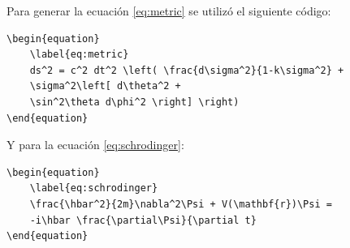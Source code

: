 Para generar la ecuación \ref{eq:metric} se utilizó el siguiente código:

\begin{verbatim}
\begin{equation}
	\label{eq:metric}
	ds^2 = c^2 dt^2 \left( \frac{d\sigma^2}{1-k\sigma^2} + 
	\sigma^2\left[ d\theta^2 + 
	\sin^2\theta d\phi^2 \right] \right)
\end{equation}
\end{verbatim}

Y para la ecuación \ref{eq:schrodinger}:

\begin{verbatim}
\begin{equation}
	\label{eq:schrodinger}
	\frac{\hbar^2}{2m}\nabla^2\Psi + V(\mathbf{r})\Psi = 
	-i\hbar \frac{\partial\Psi}{\partial t}
\end{equation}

\end{verbatim}